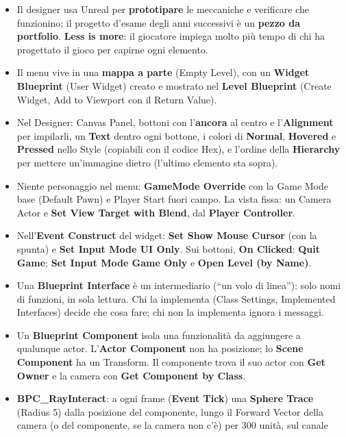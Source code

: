 \begin{itemize}
  \item Il designer usa Unreal per \textbf{prototipare} le meccaniche e verificare che
        funzionino; il progetto d'esame degli anni successivi è un \textbf{pezzo da
        portfolio}. \textbf{Less is more}: il giocatore impiega molto più tempo di chi
        ha progettato il gioco per capirne ogni elemento.
  \item Il menu vive in una \textbf{mappa a parte} (Empty Level), con un \textbf{Widget
        Blueprint} (User Widget) creato e mostrato nel \textbf{Level Blueprint} (Create
        Widget, Add to Viewport con il Return Value).
  \item Nel Designer: Canvas Panel, bottoni con l'\textbf{ancora} al centro e
        l'\textbf{Alignment} per impilarli, un \textbf{Text} dentro ogni bottone, i colori
        di \textbf{Normal}, \textbf{Hovered} e \textbf{Pressed} nello Style (copiabili con
        il codice Hex), e l'ordine della \textbf{Hierarchy} per mettere un'immagine
        dietro (l'ultimo elemento sta sopra).
  \item Niente personaggio nel menu: \textbf{GameMode Override} con la Game Mode base
        (Default Pawn) e Player Start fuori campo. La vista fissa: un Camera Actor e
        \textbf{Set View Target with Blend}, dal \textbf{Player Controller}.
  \item Nell'\textbf{Event Construct} del widget: \textbf{Set Show Mouse Cursor} (con la
        spunta) e \textbf{Set Input Mode UI Only}. Sui bottoni, \textbf{On Clicked}:
        \textbf{Quit Game}; \textbf{Set Input Mode Game Only} e \textbf{Open Level (by
        Name)}.
  \item Una \textbf{Blueprint Interface} è un intermediario (``un volo di linea''): solo
        nomi di funzioni, in sola lettura. Chi la implementa (Class Settings,
        Implemented Interfaces) decide che cosa fare; chi non la implementa ignora i
        messaggi.
  \item Un \textbf{Blueprint Component} isola una funzionalità da aggiungere a qualunque
        actor. L'\textbf{Actor Component} non ha posizione; lo \textbf{Scene Component}
        ha un Transform. Il componente trova il suo actor con \textbf{Get Owner} e la
        camera con \textbf{Get Component by Class}.
  \item \textbf{BPC\_RayInteract}: a ogni frame (\textbf{Event Tick}) una \textbf{Sphere
        Trace} (Radius 5) dalla posizione del componente, lungo il Forward Vector della
        camera (o del componente, se la camera non c'è) per 300 unità, sul canale

\end{itemize}
